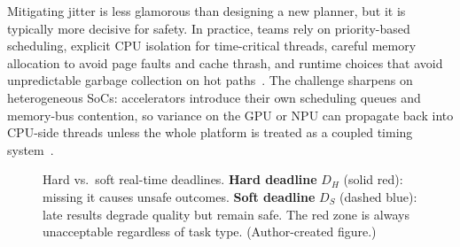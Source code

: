 \documentclass[smallextended]{svjour3}
\begin{document}
Mitigating jitter is less glamorous than designing a new planner, but it is typically more decisive for safety. In practice, teams rely on priority-based scheduling, explicit CPU isolation for time-critical threads, careful memory allocation to avoid
page faults and cache thrash, and runtime choices that avoid unpredictable garbage collection on hot paths~\cite{buttazzo2011}. The challenge sharpens on heterogeneous SoCs: accelerators introduce their own scheduling queues and memory-bus contention, so variance on the GPU or NPU can propagate back into CPU-side threads unless the whole platform is treated as a coupled timing system~\cite{sze2017,casini2019}.

\begin{figure}[htbp]
  \centering
  \caption{Hard vs.\ soft real-time deadlines. \textbf{Hard deadline} $D_H$
    (solid red): missing it causes unsafe outcomes. \textbf{Soft deadline}
    $D_S$ (dashed blue): late results degrade quality but remain safe.
    The red zone is always unacceptable regardless of task type. (Author-created figure.)}
  \label{fig:deadlines}
\end{figure}
\end{document}
